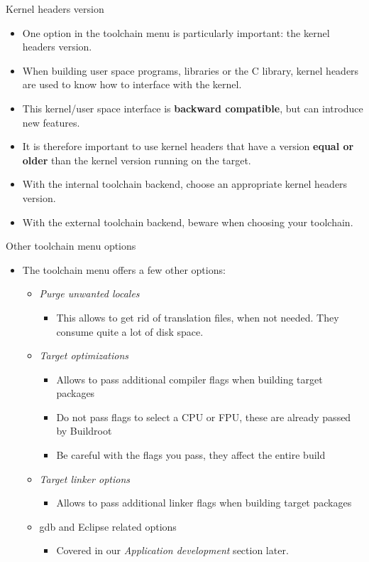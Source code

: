 \begin{frame}{Kernel headers version}
  \begin{itemize}
  \item One option in the toolchain menu is particularly important:
    the kernel headers version.
  \item When building user space programs, libraries or the C library,
    kernel headers are used to know how to interface with the kernel.
  \item This kernel/user space interface is {\bf backward compatible},
    but can introduce new features.
  \item It is therefore important to use kernel headers that have a
    version {\bf equal or older} than the kernel version running on
    the target.
  \item With the internal toolchain backend, choose an appropriate
    kernel headers version.
  \item With the external toolchain backend, beware when choosing your
    toolchain.
  \end{itemize}
\end{frame}

\begin{frame}{Other toolchain menu options}
  \begin{itemize}
  \item The toolchain menu offers a few other options:
    \begin{itemize}
    \item {\em Purge unwanted locales}
      \begin{itemize}
      \item This allows to get rid of translation files, when not
        needed. They consume quite a lot of disk space.
      \end{itemize}
    \item {\em Target optimizations}
      \begin{itemize}
      \item Allows to pass additional compiler flags when building
        target packages
      \item Do not pass flags to select a CPU or FPU, these are
        already passed by Buildroot
      \item Be careful with the flags you pass, they affect the entire
        build
      \end{itemize}
    \item {\em Target linker options}
      \begin{itemize}
      \item Allows to pass additional linker flags when building
        target packages
      \end{itemize}
    \item gdb and Eclipse related options
      \begin{itemize}
      \item Covered in our {\em Application development} section later.
      \end{itemize}
    \end{itemize}
  \end{itemize}
\end{frame}
